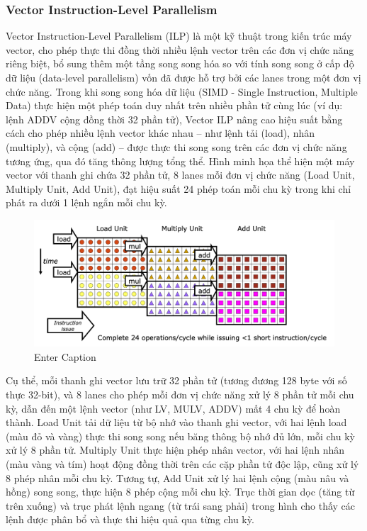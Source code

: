 \documentclass[a4paper]{article}
\begin{document}
\subsubsection{Vector Instruction-Level Parallelism}
Vector Instruction-Level Parallelism (ILP) là một kỹ thuật trong kiến trúc máy vector, cho phép thực thi đồng thời nhiều lệnh vector trên các đơn vị chức năng riêng biệt, bổ sung thêm một tầng song song hóa so với tính song song ở cấp độ dữ liệu (data-level parallelism) vốn đã được hỗ trợ bởi các lanes trong một đơn vị chức năng. Trong khi song song hóa dữ liệu (SIMD - Single Instruction, Multiple Data) thực hiện một phép toán duy nhất trên nhiều phần tử cùng lúc (ví dụ: lệnh ADDV cộng đồng thời 32 phần tử), Vector ILP nâng cao hiệu suất bằng cách cho phép nhiều lệnh vector khác nhau – như lệnh tải (load), nhân (multiply), và cộng (add) – được thực thi song song trên các đơn vị chức năng tương ứng, qua đó tăng thông lượng tổng thể. Hình minh họa thể hiện một máy vector với thanh ghi chứa 32 phần tử, 8 lanes mỗi đơn vị chức năng (Load Unit, Multiply Unit, Add Unit), đạt hiệu suất 24 phép toán mỗi chu kỳ trong khi chỉ phát ra dưới 1 lệnh ngắn mỗi chu kỳ.
\begin{figure}[H]
    \centering
    \includegraphics[width=1\linewidth]{assets/vector-instruction-level.png}
    \caption{Enter Caption}
    \label{fig:enter-label}
\end{figure}
Cụ thể, mỗi thanh ghi vector lưu trữ 32 phần tử (tương đương 128 byte với số thực 32-bit), và 8 lanes cho phép mỗi đơn vị chức năng xử lý 8 phần tử mỗi chu kỳ, dẫn đến một lệnh vector (như LV, MULV, ADDV) mất 4 chu kỳ để hoàn thành. Load Unit tải dữ liệu từ bộ nhớ vào thanh ghi vector, với hai lệnh load (màu đỏ và vàng) thực thi song song nếu băng thông bộ nhớ đủ lớn, mỗi chu kỳ xử lý 8 phần tử. Multiply Unit thực hiện phép nhân vector, với hai lệnh nhân (màu vàng và tím) hoạt động đồng thời trên các cặp phần tử độc lập, cũng xử lý 8 phép nhân mỗi chu kỳ. Tương tự, Add Unit xử lý hai lệnh cộng (màu nâu và hồng) song song, thực hiện 8 phép cộng mỗi chu kỳ. Trục thời gian dọc (tăng từ trên xuống) và trục phát lệnh ngang (từ trái sang phải) trong hình cho thấy các lệnh được phân bổ và thực thi hiệu quả qua từng chu kỳ.
\end{document}
